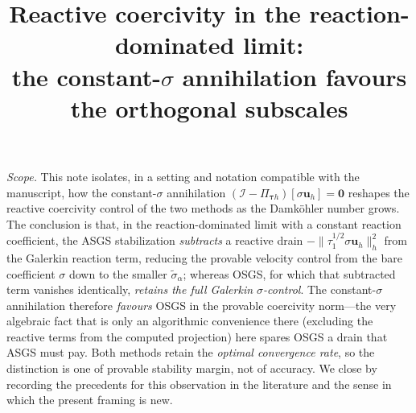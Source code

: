 \documentclass[11pt]{article}
\title{Reactive coercivity in the reaction-dominated limit: \\[2pt]
the constant-$\sigma$ annihilation favours the orthogonal subscales}
\author{}
\date{}
\theoremstyle{plain}
\theoremstyle{remark}
\newcommand{\uh}{\boldsymbol{u}_h}
\newcommand{\Pio}{\Pi_{\boldsymbol{\tau}h}}            %
\newcommand{\siga}{\widetilde{\sigma}_\alpha}
\begin{document}
\maketitle

\noindent
\textit{Scope.}\; This note isolates, in a setting and notation compatible with the
manuscript, how the constant-$\sigma$ annihilation
$(\mathcal{I}-\Pio)[\sigma\uh]=\boldsymbol{0}$ reshapes the reactive coercivity
control of the two methods as the Damk\"ohler number grows. The conclusion is that,
in the reaction-dominated limit with a constant reaction coefficient, the ASGS
stabilization \emph{subtracts} a reactive drain $-\|\tau_1^{1/2}\sigma\uh\|_h^2$
from the Galerkin reaction term, reducing the provable velocity control from the
bare coefficient $\sigma$ down to the smaller $\siga$; whereas OSGS, for which that
subtracted term vanishes identically, \emph{retains the full Galerkin
$\sigma$-control}. The constant-$\sigma$ annihilation therefore \emph{favours} OSGS
in the provable coercivity norm---the very algebraic fact that is only an
algorithmic convenience there (excluding the reactive terms from the computed
projection) here spares OSGS a drain that ASGS must pay. Both methods retain the
\emph{optimal convergence rate}, so the distinction is one of provable stability
margin, not of accuracy. We close by recording the precedents for this observation
in the literature and the sense in which the present framing is new.

\end{document}
